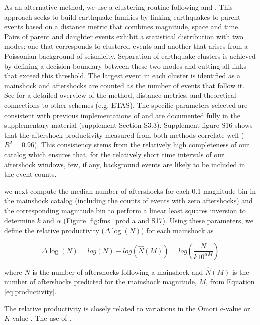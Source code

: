 \documentclass[draft, jgrga]{agujournal2018}
\begin{document}
As an alternative method, we use a clustering routine following \citet{Zaliapin2008} and \citet{Goebel2019AftershockOklahoma}. This approach seeks to build earthquake families by linking earthquakes to parent events based on a distance metric that combines magnitude, space and time. Pairs of parent and daughter events exhibit a statistical distribution with two modes: one that corresponds to clustered events and another that arises from a Poissonian background of seismicity. Separation of earthquake clusters is achieved by defining a decision boundary between these two modes and cutting all links that exceed this threshold. The largest event in each cluster is identified as a mainshock and aftershocks are counted as the number of events that follow it. See \citet{Zaliapin2008} for a detailed overview of the method, distance metrics, and theoretical connections to other schemes (e.g. ETAS). The specific parameters selected are consistent with previous implementations of \citet{Zaliapin2008} and are documented fully in the supplementary material (supplement Section S3.3). Supplement figure S16 shows that the aftershock productivity measured from both methods correlate well ($R^2=0.96$). This consistency stems from the relatively high completeness of our catalog which ensures that, for the relatively short time intervals of our aftershock windows, few, if any, background events are likely to be included in the event counts.

 we next compute the median number of aftershocks for each 0.1 magnitude bin in the mainshock catalog (including the counts of events with zero aftershocks) and the corresponding magnitude bin to perform a linear least squares inversion to determine $k$ and $\alpha$ (Figure \ref{fig:fms_prod}a and S17). Using these parameters, we define the relative productivity ($\Delta \log(N)$) for each mainshock as
%
\begin{linenomath*}
\begin{equation} 
    \Delta \log(N) = log(N) - log(\hat{N}(M)) = log\left(\dfrac{N}{k10^{\alpha M}}\right)
    \label{eq:residual_productivity}
\end{equation}
\end{linenomath*}
%
where $N$ is the number of aftershocks following a mainshock and $\hat{N}(M)$ is the number of aftershocks predicted for the mainshock magnitude, $M$, from Equation \ref{eq:productivity}.  

The relative productivity is closely related to variations in the Omori $a$-value or $K$ value \citep[e.g.][]{Page, Hardebeck2018UpdatedParameters, Utsu1995,Ogata1988}. The use of . 
\end{document}
